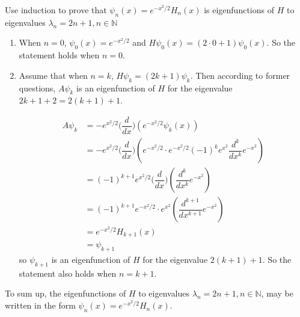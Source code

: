 \documentclass[a4paper,12pt,titlepage]{article}
\begin{document}
Use induction to prove that $\psi_n(x)=e^{-x^2/2}H_n(x)$ is eigenfunctions of $H$ to eigenvalues $\lambda_n=2n+1,n\in\mathbb{N}$
\begin{enumerate}
\item When $n=0$, $\psi_0(x)=e^{-x^2/2}$ and $H\psi_0(x)=(2\cdot0+1)\psi_0(x)$. So the statement holds when $n=0$.

\item Assume that when $n=k$, $H\psi_k=(2k+1)\psi_k$. Then according to former questions, $A\psi_k$ is an eigenfunction of $H$ for the eigenvalue $2k+1+2=2(k+1)+1$.

\begin{align*}
A\psi_k&=-e^{x^2/2}\Big(\dfrac{d}{dx}\Big)(e^{-x^2/2}\psi_k(x))\\
&=-e^{x^2/2}\Big(\dfrac{d}{dx}\Big)(e^{-x^2/2}\cdot e^{-x^2/2}(-1)^ke^{x^2}\dfrac{d^k}{dx^k}e^{-x^2})\\
&=(-1)^{k+1}e^{x^2/2}\Big(\dfrac{d}{dx}\Big)(\dfrac{d^k}{dx^k}e^{-x^2})\\
&=(-1)^{k+1}e^{-x^2/2}\cdot e^{x^2}(\dfrac{d^{k+1}}{dx^{k+1}}e^{-x^2})\\
&=e^{-x^2/2}H_{k+1}(x)\\
&=\psi_{k+1}
\end{align*}
so $\psi_{k+1}$ is an eigenfunction of $H$ for the eigenvalue $2(k+1)+1$. So the statement also holds when $n=k+1$.
\end{enumerate}

To sum up, the eigenfunctions of $H$ to eigenvalues $\lambda_n = 2n+1, n \in \mathbb{N}$, may be written in the
form  $\psi_n(x) = e^{-x^2/2}H_n(x)$.
\end{document}
